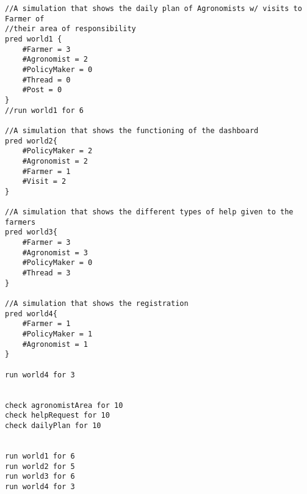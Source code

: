 \begin{lstlisting}[language=alloy]
//A simulation that shows the daily plan of Agronomists w/ visits to Farmer of
//their area of responsibility
pred world1 {
	#Farmer = 3
	#Agronomist = 2
	#PolicyMaker = 0
	#Thread = 0
	#Post = 0
}
//run world1 for 6

//A simulation that shows the functioning of the dashboard
pred world2{
	#PolicyMaker = 2
	#Agronomist = 2
	#Farmer = 1
	#Visit = 2
}

//A simulation that shows the different types of help given to the farmers
pred world3{
	#Farmer = 3
	#Agronomist = 3
	#PolicyMaker = 0
	#Thread = 3
}

//A simulation that shows the registration
pred world4{
	#Farmer = 1
	#PolicyMaker = 1
	#Agronomist = 1
}

run world4 for 3


check agronomistArea for 10
check helpRequest for 10
check dailyPlan for 10


run world1 for 6
run world2 for 5
run world3 for 6
run world4 for 3

\end{lstlisting}    